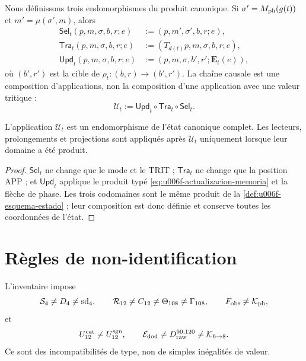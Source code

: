 Nous définissons trois endomorphismes du produit canonique. Si
\(\sigma'=M_{\rm ph}(g(t))\) et \(m'=\mu(\sigma',m)\), alors
\begin{align}
 \mathsf{Sel}_t(p,m,\sigma,b,r;e)
  &:=(p,m',\sigma',b,r;e),\label{eq:u006f-selector-tipado}\\
 \mathsf{Tra}_t(p,m,\sigma,b,r;e)
  &:=(T_{d(t)}p,m,\sigma,b,r;e),\label{eq:u006f-transporte-tipado}\\
 \mathsf{Upd}_t(p,m,\sigma,b,r;e)
  &:=(p,m,\sigma,b',r';\mathbf E_t(e)),
 \label{eq:u006f-memoria-tipada}
\end{align}
où \((b',r')\) est la cible de \(\rho_t:(b,r)\to(b',r')\). La chaîne causale est une composition d'applications, non la composition d'une application avec une valeur tritique :
\begin{equation}
 \boxed{\mathcal U_t:=
 \mathsf{Upd}_t\circ\mathsf{Tra}_t\circ\mathsf{Sel}_t.}
 \label{eq:u006f-tuberia}
\end{equation}

\begin{theorem}
\label{thm:u006f-cierre-tuberia}
L’application \(\mathcal U_t\) est un endomorphisme de l’état canonique
complet. Les lecteurs, prolongements et projections sont appliqués après
\(\mathcal U_t\) uniquement lorsque leur domaine a été produit.
\end{theorem}

\begin{proof}
\(\mathsf{Sel}_t\) ne change que le mode et le TRIT ;
\(\mathsf{Tra}_t\) ne change que la position APP ; et
\(\mathsf{Upd}_t\) applique le produit typé
\eqref{eq:u006f-actualizacion-memoria} et la flèche de phase. Les trois
codomaines sont le même produit de la
\cref{def:u006f-esquema-estado} ; leur composition est donc définie et
conserve toutes les coordonnées de l’état.
\end{proof}

\section{Règles de non-identification}

L’inventaire impose
\begin{equation}
 \mathcal S_4\neq D_4\neq\operatorname{sd}_4,
 \qquad
 \mathcal R_{12}\neq C_{12}\neq\Theta_{108}\neq\Gamma_{108},
 \qquad
 F_{\rm obs}\neq\mathcal K_{\rm ph},
 \label{eq:u006f-no-identificacion-uno}
\end{equation}
et
\begin{equation}
 U_{12}^{\rm cat}\neq U_{12}^{\rm sgn},
 \qquad
 \mathcal E_{\rm dod}\neq D_{\rm raw}^{90,120}
 \neq\mathcal K_{6\to8}.
 \label{eq:u006f-no-identificacion-dos}
\end{equation}
Ce sont des incompatibilités de type, non de simples inégalités de valeur.

